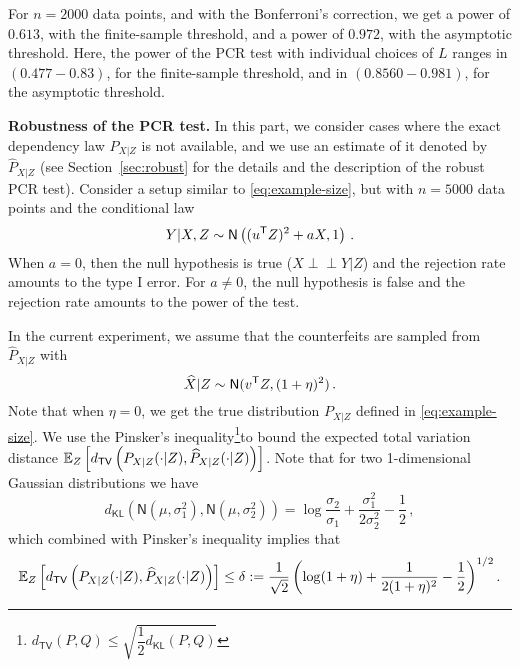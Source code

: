 \documentclass[11pt]{article}
\newcommand{\indep}{\perp \!\!\! \perp}
\def\hP{\widehat{P}}
\def\hX{\widehat{X}}
\def\normal{\mathsf{N}}
\def\tv{\mathsf{TV}}
\begin{document}
	For $n=2000$ data points, and with the Bonferroni's correction, we get a power of $0.613$, with the finite-sample threshold, and a power of $0.972$, with the asymptotic threshold. Here, the power of the PCR test with individual choices of $L$  ranges in $(0.477-0.83)$, for the finite-sample threshold, and in $(0.8560-0.981)$, for the asymptotic threshold. 
	\bigskip
	
	\noindent
	\textbf{Robustness of the PCR test.}	In this part, we consider cases where the exact dependency law $P_{X|Z}$ is not available, and we use an estimate of it denoted by $\hP_{X|Z}$ (see Section~\ref{sec:robust} for the details and the description of the robust PCR test). 
	  Consider a setup similar to \eqref{eq:example-size}, but with $n=5000$ data points and the conditional law 
	\begin{equation}\label{eq:model-aj}
		Y|X,Z \sim \normal  \left((u^\sT Z)^2+a X,1 \right)\,.
	\end{equation}
	When $a=0$, then the null hypothesis is true ($X\indep Y|Z$) and the rejection rate amounts to the type I error. For $a\neq 0$, the null hypothesis is false and the rejection rate amounts to the power of the test.
	
	 In the current experiment, we assume that the counterfeits are sampled from $\hP_{X|Z}$ with
	 \begin{equation}\label{eq: ex-robust}
	 \hX|Z\sim\normal(v^\sT Z,(1+\eta)^2)\,.
	 \end{equation}
	Note that when $\eta=0$, we get the true distribution $P_{X|Z}$ defined in \eqref{eq:example-size}. We use the Pinsker's inequality\footnote{$d_{\tv}(P,Q)\leq \sqrt{\dfrac{1}{2} d_{\mathsf{KL}}(P,Q)} $}to bound the expected total variation distance $\E_{Z}\left[d_{\tv}\left(P_{X|Z}(\cdot|Z),\hP_{X|Z}(\cdot|Z)  \right)\right]$. Note that for two 1-dimensional Gaussian distributions we have $$d_{\mathsf{KL}}\left(\normal(\mu,\sigma^2_1), \normal(\mu,\sigma^2_2)\right) =\log \frac{\sigma_2}{\sigma_1} +\frac{\sigma_1^2}{2\sigma_2^2}-\frac{1}{2}\,,$$
	which combined with Pinsker's inequality implies that
	\begin{equation}\label{eq: robust-delta}
	 \E_{Z}\left[d_{\tv}\left(P_{X|Z}(\cdot|Z),\hP_{X|Z}(\cdot|Z)  \right)\right] \leq \delta:= \frac{1}{\sqrt{2}} \left(\log(1+\eta)+\frac{1}{2(1+\eta)^2}-\frac{1}{2}\right)^{1/2}. 
	 \end{equation}
\end{document}

